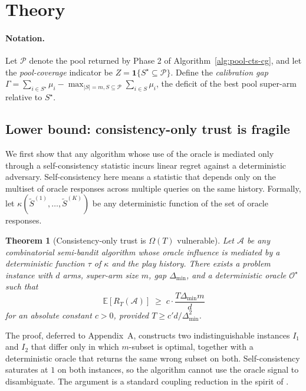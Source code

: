 \documentclass{article}
\theoremstyle{plain}
\newtheorem{theorem}{Theorem}
\theoremstyle{definition}
\theoremstyle{remark}
\newcommand{\E}{\mathbb{E}}
\newcommand{\Pool}{\mathcal{P}}
\newcommand{\opt}{S^{\star}}
\newcommand{\gap}{\Delta_{\min}}
\begin{document}
\section{Theory}
\label{sec:theory}

\paragraph{Notation.} Let $\Pool$ denote the pool returned by Phase 2 of Algorithm~\ref{alg:pool-cts-cg}, and let the \emph{pool-coverage} indicator be $Z = \mathbf{1}\{\opt \subseteq \Pool\}$. Define the \emph{calibration gap} $\Gamma = \sum_{i \in \opt} \mu_i - \max_{|S| = m, S \subseteq \Pool} \sum_{i \in S} \mu_i$, the deficit of the best pool super-arm relative to $\opt$.

\subsection{Lower bound: consistency-only trust is fragile}

We first show that any algorithm whose use of the oracle is mediated only through a self-consistency statistic incurs linear regret against a deterministic adversary. Self-consistency here means a statistic that depends only on the multiset of oracle responses across multiple queries on the same history. Formally, let $\kappa(\tilde{S}^{(1)}, \dots, \tilde{S}^{(K)})$ be any deterministic function of the set of oracle responses.

\begin{theorem}[Consistency-only trust is $\Omega(T)$ vulnerable]
\label{thm:lowerbound}
Let $\mathcal{A}$ be any combinatorial semi-bandit algorithm whose oracle influence is mediated by a deterministic function $\tau$ of $\kappa$ and the play history. There exists a problem instance with $d$ arms, super-arm size $m$, gap $\gap$, and a deterministic oracle $\mathcal{O}^{\star}$ such that
\[
\E\!\left[R_T(\mathcal{A})\right] \;\geq\; c \cdot \frac{T \gap m}{d}
\]
for an absolute constant $c > 0$, provided $T \geq c' d / \gap^2$.
\end{theorem}

The proof, deferred to Appendix~A, constructs two indistinguishable instances $I_1$ and $I_2$ that differ only in which $m$-subset is optimal, together with a deterministic oracle that returns the same wrong subset on both. Self-consistency saturates at $1$ on both instances, so the algorithm cannot use the oracle signal to disambiguate. The argument is a standard coupling reduction in the spirit of \citet{lykouris2018robust}.
\end{document}
